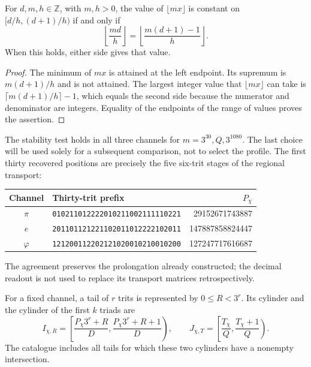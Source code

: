 \begin{lemma}
\label{censo:estabilidad}
For \(d,m,h\in\mathbb Z\), with \(m,h>0\), the value of
\(\lfloor mx\rfloor\) is constant on \([d/h,(d+1)/h)\) if and only if
\begin{equation}
 \left\lfloor\frac{md}{h}\right\rfloor
 =\left\lfloor\frac{m(d+1)-1}{h}\right\rfloor.
 \label{censo:prueba-estabilidad}
\end{equation}
When this holds, either side gives that value.
\end{lemma}
\begin{proof}
The minimum of \(mx\) is attained at the left endpoint. Its supremum
is \(m(d+1)/h\) and is not attained. The largest integer value that
\(\lfloor mx\rfloor\) can take is
\(\lceil m(d+1)/h\rceil-1\), which equals the second side because
the numerator and denominator are integers. Equality of the endpoints
of the range of values proves the assertion.
\end{proof}

The stability test holds in all three channels for
\(m=3^{30},Q,3^{1080}\). The last choice will be used solely
for a subsequent comparison, not to select the profile. The
first thirty recovered positions are precisely the five
six-trit stages of the regional transport:
\begin{center}\small
\begin{tabular}{@{}c l r@{}}\toprule
Channel&Thirty-trit prefix&\(P_\chi\)\\\midrule
\(\pi\)&\texttt{010211012222010211002111110221}&29152671743887\\
\(e\)&\texttt{201101121221102011012222102011}&147887858824447\\
\(\varphi\)&\texttt{121200112202121020010210010200}&127247717616687\\\bottomrule
\end{tabular}
\end{center}
The agreement preserves the prolongation already constructed; the decimal readout
is not used to replace its transport matrices retrospectively.

For a fixed channel, a tail of \(r\) trits is represented by
\(0\leq R<3^r\). Its cylinder and the cylinder of the first \(k\)
triads are
\begin{equation}
 I_{\chi,R}=\left[\frac{P_\chi3^r+R}{D},
                       \frac{P_\chi3^r+R+1}{D}\right),\qquad
 J_{\chi,T}=\left[\frac{T_\chi}{Q},\frac{T_\chi+1}{Q}\right).
 \label{censo:dos-cilindros}
\end{equation}
The catalogue includes all tails for which these two cylinders
have a nonempty intersection.

